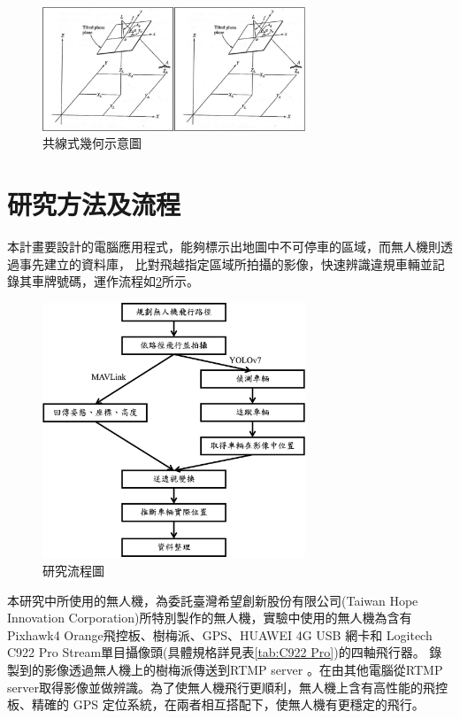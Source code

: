 \documentclass[12pt]{article}       %
\renewcommand{\figurename}{圖}                           %
\begin{document}
\begin{figure}[H]
    \centering
    \renewcommand{\figurename}{圖}                              %
    \includegraphics[width=0.7\textwidth]{ce.jpg}         %
    \caption{共線式幾何示意圖\cite{tsao2018}}           %
    \label{fig:ce}                                        %
\end{figure}

\section{\centering 研究方法及流程}
\hspace{2em}本計畫要設計的電腦應用程式，能夠標示出地圖中不可停車的區域，而無人機則透過事先建立的資料庫，
比對飛越指定區域所拍攝的影像，快速辨識違規車輛並記錄其車牌號碼，運作流程如\ref{fig:flow_chart}所示。
\begin{figure}[H]
    \centering
    \includegraphics[width=0.7\textwidth]{flow_chart.jpg}     %
    \caption{研究流程圖}    %
    \label{fig:flow_chart}    %
\end{figure}
本研究中所使用的無人機，為委託臺灣希望創新股份有限公司(Taiwan Hope Innovation Corporation)所特別製作的無人機，實驗中使用的無人機為含有 Pixhawk4 Orange飛控板、樹梅派、GPS、HUAWEI 4G USB 網卡和 Logitech C922 Pro Stream單目攝像頭(具體規格詳見表\ref{tab:C922 Pro})的四軸飛行器。
錄製到的影像透過無人機上的樹梅派傳送到RTMP server \cite{chen2011}\cite{mark2018}。在由其他電腦從RTMP server取得影像並做辨識。為了使無人機飛行更順利，無人機上含有高性能的飛控板、精確的 GPS 定位系統，在兩者相互搭配下，使無人機有更穩定的飛行。
\end{document}
